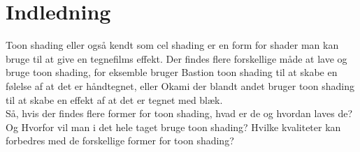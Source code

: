\section*{Indledning}
\thispagestyle{empty}
Toon shading eller også kendt som cel shading er en form for shader man kan bruge til at give en tegnefilms effekt. Der findes flere forskellige måde at lave og bruge toon shading, for eksemble bruger Bastion toon shading til at skabe en følelse af at det er håndtegnet, eller Okami der blandt andet bruger toon shading til at skabe en effekt af at det er tegnet med blæk.
\\
Så, hvis der findes flere former for toon shading, hvad er de og hvordan laves de? Og Hvorfor vil man i det hele taget bruge toon shading? Hvilke kvaliteter kan forbedres med de forskellige former for toon shading?
